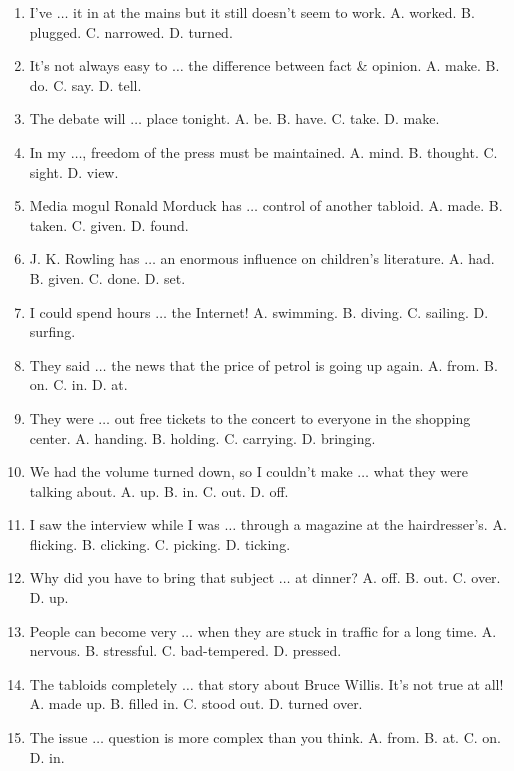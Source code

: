 \documentclass{article}
\numberwithin{equation}{section}
\begin{document}
\begin{enumerate}[leftmargin=8mm]
	\item I've $\ldots$ it in at the mains but it still doesn't seem to work. {\sf A.} worked. {\sf B.} plugged. {\sf C.} narrowed. {\sf D.} turned.
	\item It's not always easy to $\ldots$ the difference between fact \& opinion. {\sf A.} make. {\sf B.} do. {\sf C.} say. {\sf D.} tell.
	\item The debate will $\ldots$ place tonight. {\sf A.} be. {\sf B.} have. {\sf C.} take. {\sf D.} make.
	\item In my $\ldots$, freedom of the press must be maintained. {\sf A.} mind. {\sf B.} thought. {\sf C.} sight. {\sf D.} view.
	\item Media mogul Ronald Morduck has $\ldots$ control of another tabloid. {\sf A.} made. {\sf B.} taken. {\sf C.} given. {\sf D.} found.
	\item J. K. Rowling has $\ldots$ an enormous influence on children's literature. {\sf A.} had. {\sf B.} given. {\sf C.} done. {\sf D.} set.
	\item I could spend hours $\ldots$ the Internet! {\sf A.} swimming. {\sf B.} diving. {\sf C.} sailing. {\sf D.} surfing.
	\item They said $\ldots$ the news that the price of petrol is going up again. {\sf A.} from. {\sf B.} on. {\sf C.} in. {\sf D.} at.
	\item They were $\ldots$ out free tickets to the concert to everyone in the shopping center. {\sf A.} handing. {\sf B.} holding. {\sf C.} carrying. {\sf D.} bringing.
	\item We had the volume turned down, so I couldn't make $\ldots$ what they were talking about. {\sf A.} up. {\sf B.} in. {\sf C.} out. {\sf D.} off.
	\item I saw the interview while I was $\ldots$ through a magazine at the hairdresser's. {\sf A.} flicking. {\sf B.} clicking. {\sf C.} picking. {\sf D.} ticking.
	\item Why did you have to bring that subject $\ldots$ at dinner? {\sf A.} off. {\sf B.} out. {\sf C.} over. {\sf D.} up.
	\item People can become very $\ldots$ when they are stuck in traffic for a long time. {\sf A.} nervous. {\sf B.} stressful. {\sf C.} bad-tempered. {\sf D.} pressed.
	\item The tabloids completely $\ldots$ that story about Bruce Willis. It's not true at all! {\sf A.} made up. {\sf B.} filled in. {\sf C.} stood out. {\sf D.} turned over.
	\item The issue $\ldots$ question is more complex than you think. {\sf A.} from. {\sf B.} at. {\sf C.} on. {\sf D.} in.

\end{enumerate}
\end{document}
